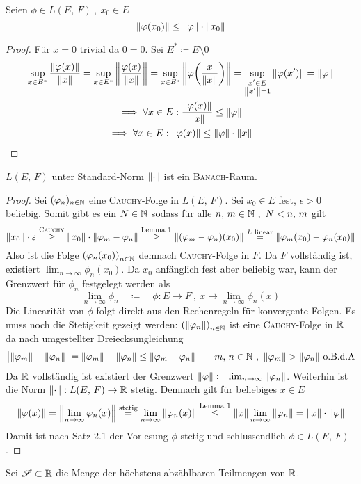 \documentclass{anablatt}
\begin{document}
\begin{lemma}
Seien $\phi \in L(E,\,F) ~,~ x_0 \in E$
\[ \norm{\varphi(x_0)} \leq \norm{\varphi}\cdot\norm{x_0} \]
\end{lemma}
\begin{proof} Für $x = 0$ trivial da $0 = 0$. Sei $E^* \coloneqq E \setminus \qty{0}$
\begin{gather*}
    \sup_{x \in E^*} \frac{\norm{\varphi(x)}}{\norm{x}}
    = \sup_{x \in E^*} \norm{\frac{\varphi(x)}{\norm{x}}}
    = \sup_{x \in E^*} \norm{\varphi\qty(\frac{x}{\norm{x}})}
    = \sup_{\substack{x' \in E\\\norm{x'}=1}} \norm{\varphi(x')}
    = \norm{\varphi}
    \\
    \implies \forall x \in E : \frac{\norm{\varphi(x)}}{\norm{x}} \leq \norm{\varphi} \\
    \implies \forall x \in E : \norm{\varphi(x)} \leq \norm{\varphi} \cdot \norm{x}
\end{gather*}
\end{proof}
\newpage
\begin{theorem}
    $L(E,\, F)$ unter Standard-Norm $\norm{\cdot}$ ist ein \textsc{Banach}-Raum.
\end{theorem}
\begin{proof}
Sei $(\varphi_n)_{n \in \mathbb{N}}$ eine \textsc{Cauchy}-Folge in $L(E,\, F)$. Sei $x_0 \in E$ fest, $\epsilon > 0$ beliebig. Somit gibt es ein $N \in \mathbb{N}$ sodass für alle $n,\, m \in \mathbb{N} ~,~ N < n,\, m$ gilt
\[
    \norm{x_0}\cdot\varepsilon
    \stackrel{\textsc{Cauchy}}\geq \norm{x_0}\cdot\norm{\varphi_m-\varphi_n} 
    \stackrel{\text{Lemma 1}}\geq \norm{(\varphi_m-\varphi_n)(x_0)}
    \stackrel{L \text{ linear}}= \norm{\varphi_m(x_0) - \varphi_n(x_0)}
\]
Also ist die Folge $\qty(\varphi_n(x_0))_{n \in \mathbb{N}}$ demnach \textsc{Cauchy}-Folge in $F$. Da $F$ vollständig ist, existiert $\lim_{n \rightarrow \infty} \phi_n(x_0)$. Da $x_0$ anfänglich fest aber beliebig war, kann der Grenzwert für $\phi_n$ festgelegt werden als
\[ \lim_{n \rightarrow \infty}\phi_n \quad\coloneqq\quad \phi : E \rightarrow F ~,~ x \mapsto \lim_{n \rightarrow \infty} \phi_n(x) \]
Die Linearität von $\phi$ folgt direkt aus den Rechenregeln für konvergente Folgen. Es muss noch die Stetigkeit gezeigt werden: $\qty(\norm{\varphi_n})_{n \in \mathbb{N}}$ ist eine \textsc{Cauchy}-Folge in $\mathbb{R}$ da nach umgestellter Dreiecksungleichung
\[ \abs\big{\norm{\varphi_m} - \norm{\varphi_n}} = \norm{\varphi_m} - \norm{\varphi_n} \leq \norm{\varphi_m - \varphi_n} \qquad m,\, n \in \mathbb{N} ~,~ \norm{\varphi_m} > \norm{\varphi_n} \text{ o.B.d.A}\]
Da $\mathbb{R}$ vollständig ist existiert der Grenzwert $\norm{\varphi} \coloneqq \lim_{n \rightarrow \infty} \norm{\varphi_n}$. Weiterhin ist die Norm $\norm{\cdot} : L(E,\, F) \rightarrow \mathbb{R}$ stetig. Demnach gilt für beliebiges $x \in E$
\[
    \norm{\varphi(x)} = \norm{\lim_{n\rightarrow\infty}\varphi_n(x)}
    \stackrel{\text{stetig}}= \lim_{n\rightarrow\infty}\norm{\varphi_n(x)} 
    \stackrel{\text{Lemma 1}}\leq \norm{x}\lim_{n\rightarrow\infty}\norm{\varphi_n}
    = \norm{x}\cdot\norm{\varphi}
\]
Damit ist nach Satz 2.1 der Vorlesung $\phi$ stetig und schlussendlich $\phi \in L(E,\, F)$.
\end{proof}
\task Sei $\mathscr{S} \subset \mathbb{R}$ die Menge der höchstens abzählbaren Teilmengen von $\mathbb{R}$.
\end{document}
